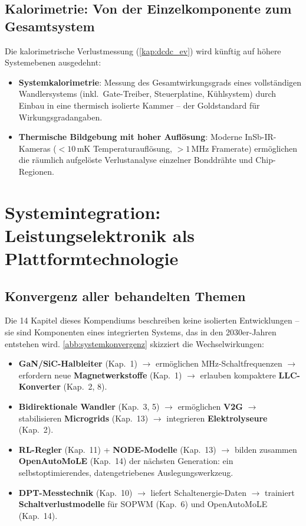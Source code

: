﻿\documentclass[a4paper,12pt,openany,oneside]{book}
\newcommand{\abschnitt}[1]{\section{#1}}
\newcommand{\unterabschnitt}[1]{\subsection{#1}}
\theoremstyle{definition}
\begin{document}
\unterabschnitt{Kalorimetrie: Von der Einzelkomponente zum Gesamtsystem}

Die kalorimetrische Verlustmessung (\autoref{kap:dcdc_ev}) wird k\"unftig auf h\"ohere
Systemebenen ausgedehnt:
\begin{itemize}
  \item \textbf{Systemkalorimetrie}: Messung des Gesamtwirkungsgrads eines vollst\"andigen
    Wandlersystems (inkl.\ Gate-Treiber, Steuerplatine, K\"uhlsystem) durch Einbau in eine
    thermisch isolierte Kammer -- der \glqq{}Goldstandard\grqq{} f\"ur Wirkungsgradangaben.
  \item \textbf{Thermische Bildgebung mit hoher Aufl\"osung}: Moderne InSb-IR-Kameras
    ($< 10\,\mathrm{mK}$ Temperaturaufl\"osung, $> 1\,\mathrm{MHz}$ Framerate) erm\"oglichen
    die r\"aumlich aufgel\"oste Verlustanalyse einzelner Bonddr\"ahte und Chip-Regionen.
\end{itemize}

\abschnitt{Systemintegration: Leistungselektronik als Plattformtechnologie}

\unterabschnitt{Konvergenz aller behandelten Themen}

Die 14 Kapitel dieses Kompendiums beschreiben keine isolierten Entwicklungen -- sie
sind Komponenten eines integrierten Systems, das in den 2030er-Jahren entstehen wird.
\autoref{abb:systemkonvergenz} skizziert die Wechselwirkungen:

\begin{itemize}
  \item \textbf{GaN/SiC-Halbleiter} (Kap.\ 1) $\rightarrow$ erm\"oglichen MHz-Schaltfrequenzen
    $\rightarrow$ erfordern neue \textbf{Magnetwerkstoffe} (Kap.\ 1) $\rightarrow$ erlauben
    kompaktere \textbf{LLC-Konverter} (Kap.\ 2, 8).
  \item \textbf{Bidirektionale Wandler} (Kap.\ 3, 5) $\rightarrow$ erm\"oglichen \textbf{V2G}
    $\rightarrow$ stabilisieren \textbf{Microgrids} (Kap.\ 13) $\rightarrow$ integrieren
    \textbf{Elektrolyseure} (Kap.\ 2).
  \item \textbf{RL-Regler} (Kap.\ 11) + \textbf{NODE-Modelle} (Kap.\ 13) $\rightarrow$
    bilden zusammen \textbf{OpenAutoMoLE} (Kap.\ 14) der n\"achsten Generation: ein
    selbstoptimierendes, datengetriebenes Auslegungswerkzeug.
  \item \textbf{DPT-Messtechnik} (Kap.\ 10) $\rightarrow$ liefert Schaltenergie-Daten
    $\rightarrow$ trainiert \textbf{Schaltverlustmodelle} f\"ur SOPWM (Kap.\ 6) und
    OpenAutoMoLE (Kap.\ 14).
\end{itemize}
\end{document}
